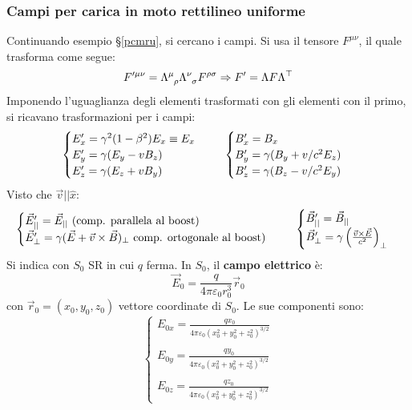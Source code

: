 \documentclass[a4paper]{scrartcl}
\numberwithin{equation}{subsection}
\theoremstyle{style1}
\begin{document}
\subsubsection{Campi per carica in moto rettilineo uniforme}
Continuando esempio \S\ref{pcmru}, si cercano i campi. Si usa il tensore $F^{\mu  \nu} $, il quale trasforma come segue:
\begin{equation}
	F'^{\mu \nu} = \Lambda\indices{^\mu _\rho } \Lambda\indices{^\nu _\sigma } F^{\rho  \sigma } \Rightarrow F' = \Lambda F \Lambda^\top  
\end{equation}
Imponendo l'uguaglianza degli elementi trasformati con gli elementi con il primo, si ricavano trasformazioni per i campi:
\begin{equation}
	\begin{cases}
		E'_x = \gamma^2 (1-\beta ^2 ) E_x \equiv E_x\\
		E'_y = \gamma(E_y - vB_z) \\
		E'_z = \gamma(E_z + vB_y)
	\end{cases}\hspace{.5cm} \begin{cases}
		B'_x = B_x\\
		B'_y = \gamma(B_y + v / c^2 E_z)\\
		B'_z = \gamma(B_z - v / c^2 E_y)
	\end{cases}
\end{equation}
Visto che $\vec{v}| | \hat{x}$:
\begin{equation}
	\begin{cases}
		\vec{E}'_{ | |} = \vec{E}_{| |} \text{ (comp. parallela al boost)} \\
		\vec{E}'_{\perp} = \gamma(\vec{E}+\vec{v}\times \vec{B})_{\perp}  \text{ comp. ortogonale al boost)} 
	\end{cases}\hspace{.5cm} \begin{cases}
		\vec{B}'_{| | } = \vec{B}_{| |}\\
		\vec{B}'_{\perp} = \gamma\left(\frac{\vec{v}\times \vec{E}}{c^2}\right) _{\perp} 
	\end{cases}
\end{equation}
Si indica con $S_0$ SR in cui $q$ ferma. In $S_0$, il \textbf{campo elettrico} \`e:
\begin{equation}
	\vec{E}_0 = \frac{q}{4\pi \varepsilon _0 r_0^3}\vec{r}_0
\end{equation}
con $\vec{r}_0 = (x_0,y_0,z_0)$ vettore coordinate di $S_0$. Le sue componenti sono:
\begin{equation}
	\begin{cases}
		\displaystyle E_{0x} = \frac{q x_0}{4\pi \varepsilon _0 (x_0^2 + y_0^2 + z_0^2)^{3 / 2} }\\
		\\
		\displaystyle E_{0y} = \frac{q y_0}{4\pi \varepsilon _0 (x_0^2 + y_0^2 + z_0^2)^{3 / 2} }\\
		\\
\displaystyle E_{0z} =\frac{q z_0}{4\pi \varepsilon _0 (x_0^2 + y_0^2 + z_0^2)^{3 / 2} }
	\end{cases}
\end{equation}
\end{document}
